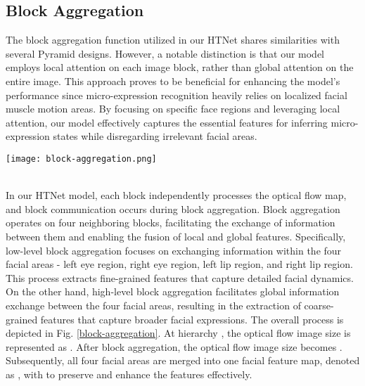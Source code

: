 \documentclass[review,12pt, 3p]{elsarticle}
\begin{document}
\subsection{Block Aggregation}
The block aggregation function utilized in our HTNet shares similarities with several Pyramid designs. However, a notable distinction is that our model employs local attention on each image block, rather than global attention on the entire image. This approach proves to be beneficial for enhancing the model's performance since micro-expression recognition heavily relies on localized facial muscle motion areas. By focusing on specific face regions and leveraging local attention, our model effectively captures the essential features for inferring micro-expression states while disregarding irrelevant facial areas.\\
\begin{figure*}[t]
\centering
  \texttt{[image: block-aggregation.png]}
  \caption{The block aggregation include  convolutional layer and followed by LN and  max pooling. At the bottom of our model, the facial optical flow map includes 16 facial blocks, which are  feature maps. By using   convolutional layer on this feature map, partial feature maps within four facial areas will be merged and the block size will become  blocks which corresponding to four facial areas-left eye region, left lip region, right eye region and right lip region.}
  \label{block-aggregation}
\end{figure*}\\
In our HTNet model, each block independently processes the optical flow map, and block communication occurs during block aggregation. Block aggregation operates on four neighboring blocks, facilitating the exchange of information between them and enabling the fusion of local and global features. Specifically, low-level block aggregation focuses on exchanging information within the four facial areas - left eye region, right eye region, left lip region, and right lip region. This process extracts fine-grained features that capture detailed facial dynamics. On the other hand, high-level block aggregation facilitates global information exchange between the four facial areas, resulting in the extraction of coarse-grained features that capture broader facial expressions. The overall process is depicted in Fig. \ref{block-aggregation}. At hierarchy , the optical flow image size is represented as . After block aggregation, the optical flow image size becomes . Subsequently, all four facial areas are merged into one facial feature map, denoted as , with  to preserve and enhance the features effectively.\\
\end{document}
